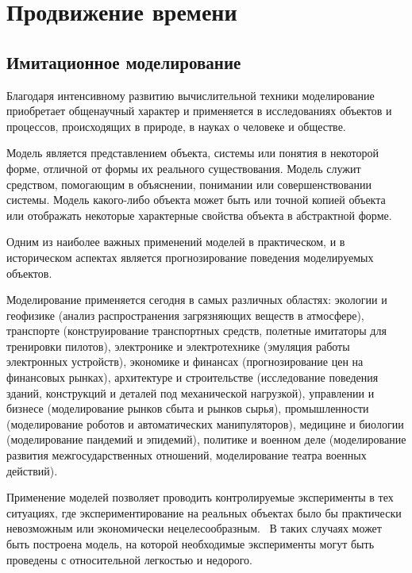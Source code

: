 \chapter{Продвижение времени} \label{chapt1}

\section{Имитационное моделирование} \label{sect1}


Благодаря интенсивному развитию вычислительной техники моделирование приобретает общенаучный характер и применяется в исследованиях объектов и процессов, происходящих в природе, в науках о человеке и обществе.

Модель является представлением объекта, системы или понятия в некоторой форме, отличной от формы их реального существования. Модель служит средством, помогающим в объяснении, понимании или совершенствовании системы. Модель какого-либо объекта может быть или точной копией объекта или отображать некоторые характерные свойства объекта в абстрактной форме.

Одним из наиболее важных применений моделей в практическом, и в историческом аспектах является прогнозирование поведения моделируемых объектов.

Моделирование применяется сегодня в самых различных областях: экологии и геофизике (анализ распространения загрязняющих веществ в атмосфере), транспорте (конструирование транспортных средств, полетные имитаторы для тренировки пилотов), электронике и электротехнике (эмуляция работы электронных устройств), экономике и финансах (прогнозирование цен на финансовых рынках), архитектуре и строительстве (исследование поведения зданий, конструкций и деталей под механической нагрузкой), управлении и бизнесе (моделирование рынков сбыта и рынков сырья), промышленности (моделирование роботов и автоматических манипуляторов), медицине и биологии (моделирование пандемий и эпидемий), политике и военном деле (моделирование развития межгосударственных отношений, моделирование театра военных действий).


Применение моделей позволяет проводить контролируемые эксперименты в тех ситуациях, где экспериментирование на реальных объектах было бы практически невозможным или экономически нецелесообразным.~\cite{Shennon} В таких случаях может быть построена модель, на которой необходимые эксперименты могут быть проведены с относительной легкостью и недорого.

